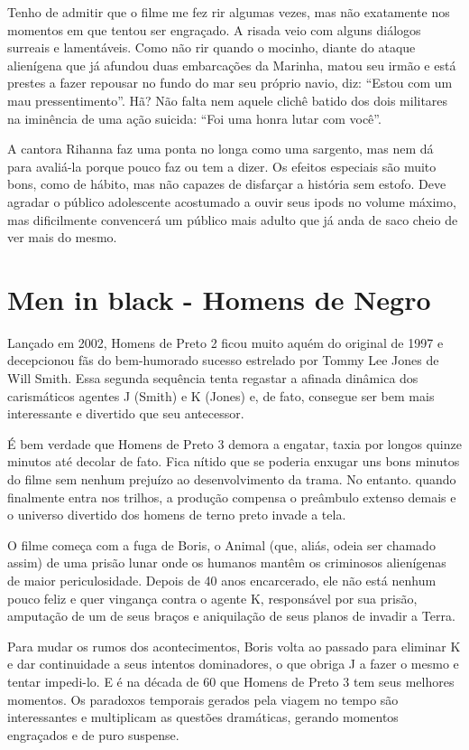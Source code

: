 \documentclass[a4paper,11pt,openright,openbib]{article}
\begin{document}
Tenho de admitir que o filme me fez rir algumas vezes, mas não exatamente nos momentos em que tentou ser engraçado. A risada veio com alguns diálogos surreais e lamentáveis. Como não rir quando o mocinho, diante do ataque alienígena que já afundou duas embarcações da Marinha, matou seu irmão e está prestes a fazer repousar no fundo do mar seu próprio navio, diz: “Estou com um mau pressentimento”. Hã? Não falta nem aquele clichê batido dos dois militares na iminência de uma ação suicida: “Foi uma honra lutar com você”.

A cantora Rihanna faz uma ponta no longa como uma sargento, mas nem dá para avaliá-la porque pouco faz ou tem a dizer. Os efeitos especiais são muito bons, como de hábito, mas não capazes de disfarçar a história sem estofo. Deve agradar o público adolescente acostumado a ouvir seus ipods no volume máximo, mas dificilmente convencerá um público mais adulto que já anda de saco cheio de ver mais do mesmo. 

\section{Men in black - Homens de Negro}
Lançado em 2002, Homens de Preto 2 ficou muito aquém do original de 1997 e decepcionou fãs do bem-humorado sucesso estrelado por Tommy Lee Jones de Will Smith. Essa segunda sequência tenta regastar a afinada dinâmica dos carismáticos agentes J (Smith) e K (Jones) e, de fato, consegue ser bem mais interessante e divertido que seu antecessor.

É bem verdade que Homens de Preto 3 demora a engatar, taxia por longos quinze minutos até decolar de fato. Fica nítido que se poderia enxugar uns bons minutos do filme sem nenhum prejuízo ao desenvolvimento da trama. No entanto. quando finalmente entra nos trilhos, a produção compensa o preâmbulo extenso demais e o universo divertido dos homens de terno preto invade a tela. 

O filme começa com a fuga de Boris, o Animal (que, aliás, odeia ser chamado assim) de uma prisão lunar onde os humanos mantêm os criminosos alienígenas de maior periculosidade. Depois de 40 anos encarcerado, ele não está nenhum pouco feliz e quer vingança contra o agente K, responsável por sua prisão, amputação de um de seus braços e aniquilação de seus planos de invadir a Terra. 

Para mudar os rumos dos acontecimentos, Boris volta ao passado para eliminar K e dar continuidade a seus intentos dominadores, o que obriga J a fazer o mesmo e tentar impedi-lo. E é na década de 60 que Homens de Preto 3 tem seus melhores momentos. Os paradoxos temporais gerados pela viagem no tempo são interessantes e multiplicam as questões dramáticas, gerando momentos engraçados e de puro suspense. 
\end{document}
